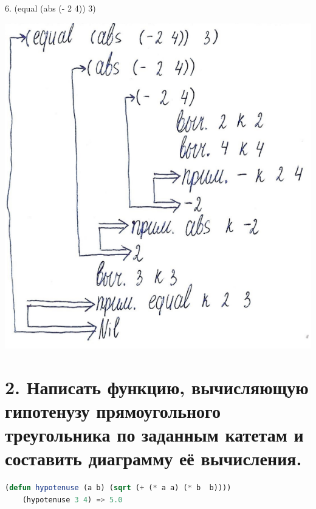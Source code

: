 \documentclass[12pt]{report}
\begin{document}
6. (equal (abs (- 2 4)) 3)

\includegraphics[scale=1]{img/1.6}

\clearpage
\section*{2. Написать функцию, вычисляющую гипотенузу прямоугольного треугольника по заданным катетам и составить диаграмму её вычисления.}

\begin{lstlisting}[language=Lisp]
	(defun hypotenuse (a b) (sqrt (+ (* a a) (* b  b))))
	(hypotenuse 3 4) => 5.0 
\end{lstlisting}
\end{document}
